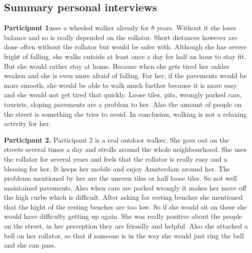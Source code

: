 




\subsection{Summary personal interviews}
\textbf{Participant 1}uses a wheeled walker already for 8 years. Without it she loses balance and so is really depended on the rollator. Short distances however are done often without the rollator but would be safer with. Although she has severe fright of falling, she walks outside at least once a day for half an hour to stay fit. But she would rather stay at home. Because when she gets tired her ankles weaken and she is even more afraid of falling. For her, if the pavements would be more smooth, she would be able to walk much further because it is more easy and she would not get tired that quickly. Loose tiles, pits, wrongly parked cars, tourists, sloping pavements are a problem to her. Also the amount of people on the street is something she tries to avoid. In conclusion, walking is not a relaxing activity for her.

\textbf{Participant 2. }
Participant 2 is a real outdoor walker. She goes out on the streets several times a day and strolls around the whole neighbourhood. She uses the rollator for several years and feels that the rollator is really easy and a blessing for her. It keeps her mobile and enjoy Amsterdam around her. The problems mentioned by her are the uneven tiles or half loose tiles. So not well maintained pavements. Also when cars are parked wrongly it makes her move off the high curbs which is difficult. After asking for resting benches she mentioned that the hight of the resting benches are too low. So if she would sit on these she would have difficulty getting up again. She was really positive about the people on the street, in her perception they are friendly and helpful. Also she attached a bell on her rollator, so that if someone is in the way she would just ring the bell and she can pass. 

